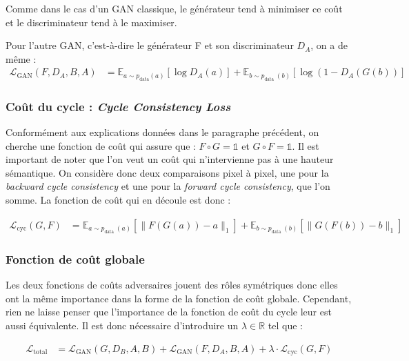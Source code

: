 Comme dans le cas d'un GAN classique, le générateur tend à minimiser ce coût et le discriminateur tend à le maximiser.

Pour l'autre GAN, c'est-à-dire le générateur F et son discriminateur $D_A$, on a de même : $$\begin{aligned}
\mathcal{L}_{\mathrm{GAN}}\left(F, D_{A}, B, A\right) &=\mathbb{E}_{a \sim p_{\mathrm{data}}(a)}\left[\log D_{A}(a)\right] +\mathbb{E}_{b \sim p_{\text {data }}(b)}\left[\log \left(1-D_{A}(G(b))\right]\right.
\end{aligned}$$

\subsubsection{Coût du cycle : \textit{Cycle Consistency Loss}}

Conformément aux explications données dans le paragraphe précédent, on cherche une fonction de coût qui assure que : $ F \circ G = \mathbb{1} $ et $ G \circ F = \mathbb{1} $. Il est important de noter que l'on veut un coût qui n'intervienne pas à une hauteur sémantique. On considère donc deux comparaisons pixel à pixel, une pour la \textit{backward cycle consistency} et une pour la \textit{forward cycle consistency}, que l'on somme. La fonction de coût qui en découle est donc :

$$\begin{aligned}
\mathcal{L}_{\mathrm{cyc}}(G, F) &=\mathbb{E}_{a \sim p_{\text {data }}(a)}\left[\|F(G(a))-a\|_{1}\right] +\mathbb{E}_{b \sim p_{\text {data }}(b)}\left[\|G(F(b))-b\|_{1}\right]
\end{aligned}$$

\subsubsection{Fonction de coût globale}

Les deux fonctions de coûts adversaires jouent des rôles symétriques donc elles ont la même importance dans la forme de la fonction de coût globale. Cependant, rien ne laisse penser que l'importance de la fonction de coût du cycle leur est aussi équivalente. Il est donc nécessaire d'introduire un $\lambda \in \mathbb{R}$ tel que :

$$\begin{aligned}
\mathcal{L}_{\text{total}} &=\mathcal{L}_{\mathrm{GAN}}\left(G, D_{B}, A, B\right) +\mathcal{L}_{\mathrm{GAN}}\left(F, D_{A}, B, A\right) +\lambda \cdot \mathcal{L}_{\mathrm{cyc}}(G, F)
\end{aligned}$$

